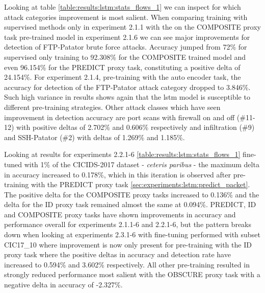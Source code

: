 Looking at table \ref{table:results:lstm:stats_flows_1} we can inspect for which attack categories improvement is most salient. When comparing training with supervised methods only in experiment 2.1.1 with the on the COMPOSITE proxy task pre-trained model in experiment 2.1.6 we can see major improvements for detection of FTP-Patator brute force attacks. Accuracy jumped from 72\% for supervised only training to 92.308\% for the COMPOSITE trained model and even 96.154\% for the PREDICT proxy task, constituting a positive delta of 24.154\%. For experiment 2.1.4, pre-training with the auto encoder task, the accuracy for detection of the FTP-Patator attack category dropped to 3.846\%. Such high variance in results shows again that the \gls{lstm} model is susceptible to different pre-training strategies. Other attack classes which have seen improvement in detection accuracy are port scans with firewall on and off (\#11-12) with positive deltas of 2.702\% and 0.606\% respectively and infiltration (\#9) and SSH-Patator (\#2) with deltas of 1.269\% and 1.185\%. \par





Looking at results for experiments 2.2.1-6 \ref{table:results:lstm:stats_flows_1} fine-tuned with 1\% of the CICIDS-2017 dataset - \textit{ceteris paribus} - the maximum delta in accuracy increased to 0.178\%, which in this iteration is observed after pre-training with the PREDICT proxy task \ref{sec:experiments:lstm:predict_packet}. The positive delta for the COMPOSITE proxy tasks increased to 0.136\% and the delta for the ID proxy task remained almost the same at 0.094\%. PREDICT, ID and COMPOSITE proxy tasks have shown improvements in accuracy and performance overall for experiments 2.1.1-6 and 2.2.1-6, but the pattern breaks down when looking at experiments 2.3.1-6 with fine-tuning performed with subset CIC17\_10 where improvement is now only present for pre-training with the ID proxy task where the positive deltas in accuracy and detection rate have increased to 0.594\% and 3.602\% respectively. All other pre-training resulted in strongly reduced performance most salient with the OBSCURE proxy task with a negative delta in accuracy of -2.327\%. \par 



